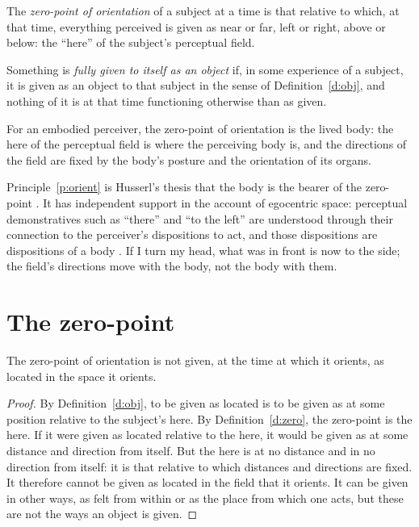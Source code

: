 \documentclass{situationist-preprint}
\begin{document}
\begin{definition}\label{d:zero}
The \emph{zero-point of orientation} of a subject at a time is that relative to which, at that time, everything perceived is given as near or far, left or right, above or below: the \enquote{here} of the subject's perceptual field.
\end{definition}

\begin{definition}\label{d:full}
Something is \emph{fully given to itself as an object} if, in some experience of a subject, it is given as an object to that subject in the sense of Definition~\ref{d:obj}, and nothing of it is at that time functioning otherwise than as given.
\end{definition}

\begin{principle}\label{p:orient}
For an embodied perceiver, the zero-point of orientation is the lived body: the here of the perceptual field is where the perceiving body is, and the directions of the field are fixed by the body's posture and the orientation of its organs.
\end{principle}

Principle~\ref{p:orient} is Husserl's thesis that the body is the bearer of the zero-point \citep[\S18]{Husserl1952}. It has independent support in the account of egocentric space: perceptual demonstratives such as \enquote{there} and \enquote{to the left} are understood through their connection to the perceiver's dispositions to act, and those dispositions are dispositions of a body \citep{Evans1982}. If I turn my head, what was in front is now to the side; the field's directions move with the body, not the body with them.

\section{The zero-point}\label{s:zero}

\begin{lemma}\label{l:notlocated}
The zero-point of orientation is not given, at the time at which it orients, as located in the space it orients.
\end{lemma}

\begin{proof}
By Definition~\ref{d:obj}, to be given as located is to be given as at some position relative to the subject's here. By Definition~\ref{d:zero}, the zero-point is the here. If it were given as located relative to the here, it would be given as at some distance and direction from itself. But the here is at no distance and in no direction from itself: it is that relative to which distances and directions are fixed. It therefore cannot be given as located in the field that it orients. It can be given in other ways, as felt from within or as the place from which one acts, but these are not the ways an object is given.
\end{proof}
\end{document}
